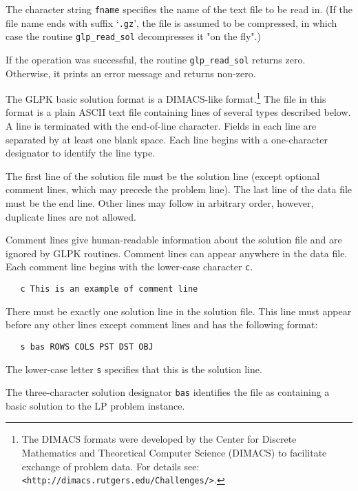 The character string \verb|fname| specifies the name of the text file
to be read in. (If the file name ends with suffix `\verb|.gz|', the
file is assumed to be compressed, in which case the routine
\verb|glp_read_sol| decompresses it "on the fly".)

\returns

If the operation was successful, the routine \verb|glp_read_sol|
returns zero. Otherwise, it prints an error message and returns
non-zero.


The GLPK basic solution format is a DIMACS-like format.\footnote{The
DIMACS formats were developed by the Center for Discrete Mathematics
and Theoretical Computer Science (DIMACS) to facilitate exchange of
problem data.
For details see: {\tt <http://dimacs.rutgers.edu/Challenges/>}. }
The file in this format is a plain ASCII text file containing lines of
several types described below. A line is terminated with the
end-of-line character. Fields in each line are separated by at least
one blank space. Each line begins with a one-character designator to
identify the line type.

The first line of the solution file must be the solution line (except
optional comment lines, which may precede the problem line). The last
line of the data file must be the end line. Other lines may follow in
arbitrary order, however, duplicate lines are not allowed.

\newpage

 Comment lines give human-readable information
about the solution file and are ignored by GLPK routines. Comment lines
can appear anywhere in the data file. Each comment line begins with the
lower-case character \verb|c|.

\begin{verbatim}
   c This is an example of comment line
\end{verbatim}

 There must be exactly one solution line in the
solution file. This line must appear before any other lines except
comment lines and has the following format:

\begin{verbatim}
   s bas ROWS COLS PST DST OBJ
\end{verbatim}

The lower-case letter \verb|s| specifies that this is the solution
line.

The three-character solution designator \verb|bas| identifies the file
as containing a basic solution to the LP problem instance.

